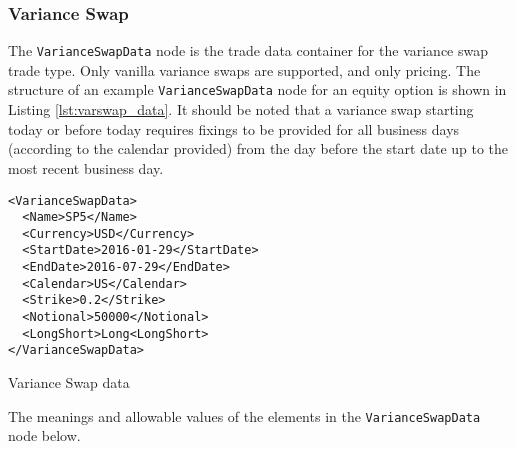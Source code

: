 \subsubsection{Variance Swap}

The \lstinline!VarianceSwapData!  node is the trade data container for the variance swap trade type. Only vanilla variance swaps are supported, and only pricing. The structure of an example \lstinline!VarianceSwapData! node for an equity option is shown in Listing \ref{lst:varswap_data}. It should be noted that a variance swap starting today or before today requires fixings to be provided for all business days (according to the calendar provided) from the day before the start date up to the most recent business day.

\begin{listing}[H]
	\begin{verbatim}
<VarianceSwapData>
  <Name>SP5</Name>
  <Currency>USD</Currency>
  <StartDate>2016-01-29</StartDate>
  <EndDate>2016-07-29</EndDate>
  <Calendar>US</Calendar>
  <Strike>0.2</Strike>
  <Notional>50000</Notional>
  <LongShort>Long<LongShort>
</VarianceSwapData>
	\end{verbatim}
	\caption{Variance Swap data}
	\label{lst:varswap_data}
\end{listing}

The meanings and allowable values of the elements in the \lstinline!VarianceSwapData!  node below.

